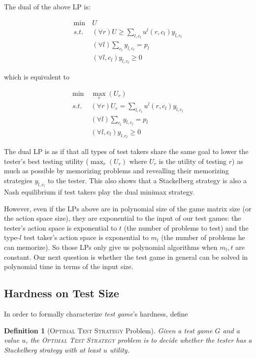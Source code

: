 \documentclass{article}
\newtheorem{definition}{Definition}
\begin{document}
The dual of the above LP is:

\begin{align}\label{eqn:dual-original}
  \min~&U\\
  s.t. &(\forall r) U \geq \sum_{l, c_l} u^l(r, c_l) y_{l, c_l}\nonumber\\
  &(\forall l) \sum_{c_l} y_{l, c_l} = p_l\nonumber\\
  &(\forall l, c_l) y_{l, c_l} \geq 0 \nonumber
\end{align}

which is equivalent to 

\begin{align}\label{eqn:minimax}
  \min~&\max_r(U_r)\\
  s.t. &(\forall r) U_r = \sum_{l, c_l} u^l(r, c_l) y_{l, c_l}\nonumber\\
  &(\forall l) \sum_{c_l} y_{l, c_l} = p_l\nonumber\\
  &(\forall l, c_l) y_{l, c_l} \geq 0\nonumber
\end{align}

The dual LP is as if that all types of test takers share the same goal to lower
the tester's best testing utility ($\max_r (U_r)$ where $U_r$ is the utility of
testing $r$) as much as possible by memorizing problems and revealling their
memorizing strategies $y_{l, c_l}$ to the tester. This also shows that a
Stackelberg strategy is also a Nash equilibrium if test takers play the dual
minimax strategy.

However, even if the LPs above are in polynomial size of the game matrix size
(or the action space size), they are exponential to the input of our test
games: the tester's action space is exponential to $t$ (the number of problems
to test) and the type-$l$ test taker's action space is exponential to $m_l$
(the number of problems he can memorize). So those LPs only give us polynomial
algorithms when $m_l, t$ are constant. Our next question is whether the test
game in general can be solved in polynomial time in terms of the input size.

\subsection{Hardness on Test Size}

In order to formally characterize \emph{test game}'s hardness, define

\begin{definition}[\textsc{Optimal Test Strategy} Problem]
Given a test game $G$ and a value $u$, the \textsc{Optimal Test Strategy}
problem is to decide whether the tester has a Stackelberg strategy with at
least $u$ utility.
\end{definition}
\end{document}
